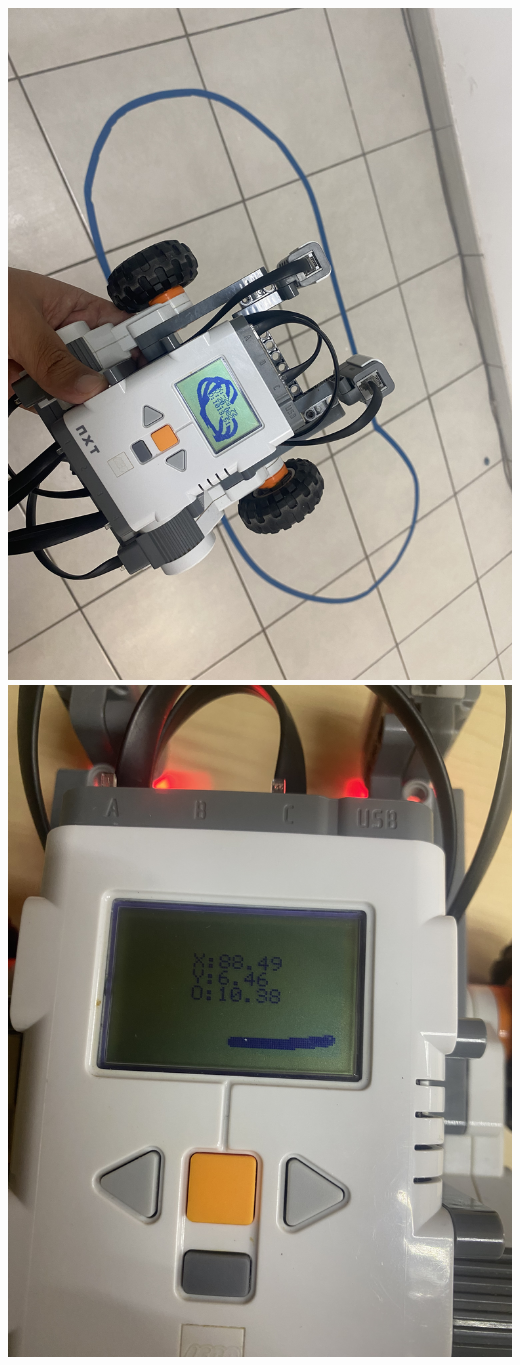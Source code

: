 \documentclass[oneside,twocolumn]{article}
\begin{document}
\includegraphics[scale=0.09]{graficos/corrida3.png}
\includegraphics[scale=0.09]{graficos/error1.png}
\end{document}
